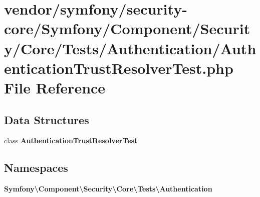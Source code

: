 \section{vendor/symfony/security-\/core/\+Symfony/\+Component/\+Security/\+Core/\+Tests/\+Authentication/\+Authentication\+Trust\+Resolver\+Test.php File Reference}
\label{_authentication_trust_resolver_test_8php}
\subsection*{Data Structures}
\begin{DoxyCompactItemize}
\item 
class {\bf Authentication\+Trust\+Resolver\+Test}
\end{DoxyCompactItemize}
\subsection*{Namespaces}
\begin{DoxyCompactItemize}
\item 
 {\bf Symfony\textbackslash{}\+Component\textbackslash{}\+Security\textbackslash{}\+Core\textbackslash{}\+Tests\textbackslash{}\+Authentication}
\end{DoxyCompactItemize}
